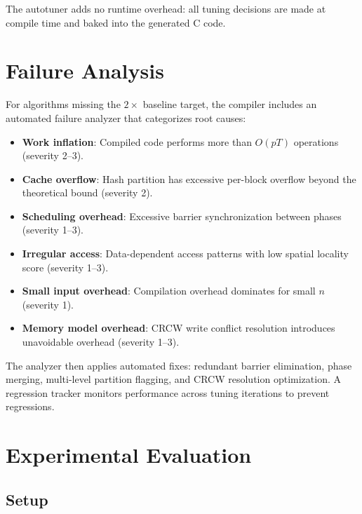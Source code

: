 \documentclass[11pt]{article}
\begin{document}
The autotuner adds no runtime overhead: all tuning decisions are made at
compile time and baked into the generated C code.


\section{Failure Analysis}
\label{sec:failure-analysis}

For algorithms missing the $2\times$ baseline target, the compiler includes
an automated failure analyzer that categorizes root causes:

\begin{itemize}
\item \textbf{Work inflation}: Compiled code performs more than $O(pT)$
  operations (severity 2--3).
\item \textbf{Cache overflow}: Hash partition has excessive per-block
  overflow beyond the theoretical bound (severity 2).
\item \textbf{Scheduling overhead}: Excessive barrier synchronization
  between phases (severity 1--3).
\item \textbf{Irregular access}: Data-dependent access patterns with
  low spatial locality score (severity 1--3).
\item \textbf{Small input overhead}: Compilation overhead dominates for
  small $n$ (severity 1).
\item \textbf{Memory model overhead}: CRCW write conflict resolution
  introduces unavoidable overhead (severity 1--3).
\end{itemize}

The analyzer then applies automated fixes: redundant barrier elimination,
phase merging, multi-level partition flagging, and CRCW resolution
optimization.  A regression tracker monitors performance across tuning
iterations to prevent regressions.


\section{Experimental Evaluation}
\label{sec:experiments}

\subsection{Setup}
\end{document}
